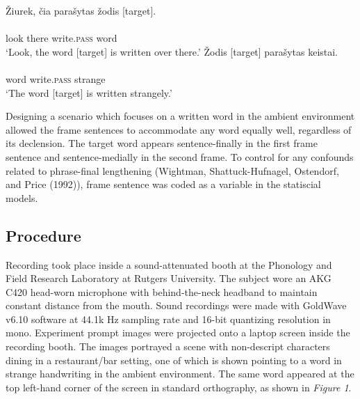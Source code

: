 \documentclass[english,man]{apa6}
\theoremstyle{definition}
\theoremstyle{definition}
\theoremstyle{definition}
\theoremstyle{remark}
\begin{document}
\begin{exe}
\ex
\begin{xlist}
\ex\label{ex1a}
\glll \v{Z}iurek, \v{c}ia para\v{s}ytas \v{z}odis [target]. \\
    {} \\
look there write.\textsc{pass} word {} \\
\glt `Look, the word [target] is written over there.'
\vspace{.5cm}
\ex\label{ex1b}
\glll \v{Z}odis [target] para\v{s}ytas keistai. \\
 {}   \\
word {} write.\textsc{pass} strange \\
\glt `The word [target] is written strangely.'
\end{xlist}
\end{exe}

Designing a scenario which focuses on a written word in the ambient
environment allowed the frame sentences to accommodate any word equally
well, regardless of its declension. The target word appears
sentence-finally in the first frame sentence and sentence-medially in
the second frame. To control for any confounds related to phrase-final
lengthening (Wightman, Shattuck-Hufnagel, Ostendorf, and Price (1992)),
frame sentence was coded as a variable in the statiscial models.

\subsection{Procedure}\label{procedure}

Recording took place inside a sound-attenuated booth at the Phonology
and Field Research Laboratory at Rutgers University. The subject wore an
AKG C420 head-worn microphone with behind-the-neck headband to maintain
constant distance from the mouth. Sound recordings were made with
GoldWave v6.10 software at 44.1k Hz sampling rate and 16-bit quantizing
resolution in mono. Experiment prompt images were projected onto a
laptop screen inside the recording booth. The images portrayed a scene
with non-descript characters dining in a restaurant/bar setting, one of
which is shown pointing to a word in strange handwriting in the ambient
environment. The same word appeared at the top left-hand corner of the
screen in standard orthography, as shown in \textit{Figure 1}.
\end{document}
